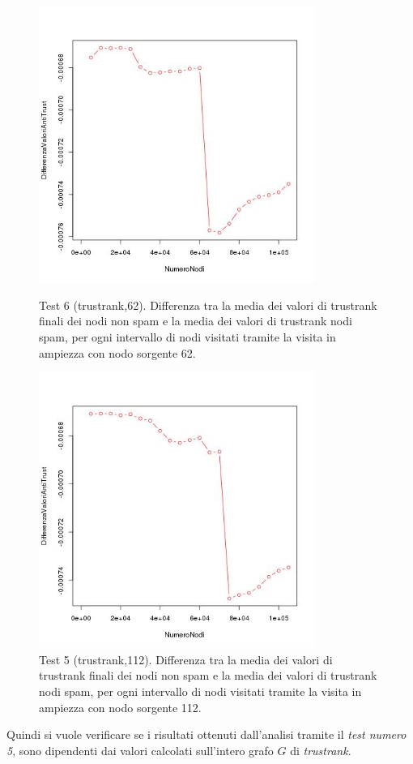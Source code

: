 \begin{figure}
 \centering
 \includegraphics[height=9cm]{immagini/test6/averageCompleteTest_antitrust_62}
  \caption{Test 6 (trustrank,62). Differenza tra la media dei valori di trustrank finali dei nodi non spam e la media dei valori di trustrank nodi spam, per ogni intervallo di nodi visitati tramite la visita in ampiezza con nodo sorgente 62.}
 \label{fig:test6antitrust62}
  \centering
 \includegraphics[height=9cm]{immagini/test6/averageCompleteTest_antitrust_112}
  \caption{Test 5 (trustrank,112). Differenza tra la media dei valori di trustrank finali dei nodi non spam e la media dei valori di trustrank nodi spam, per ogni intervallo di nodi visitati tramite la visita in ampiezza con nodo sorgente 112.}
 \label{fig:test6antitrust112}
\end{figure}

Quindi si vuole verificare se i risultati ottenuti dall'analisi tramite il \textit{test numero 5}, sono dipendenti dai valori calcolati sull'intero grafo \(G\) di \textit{trustrank}.



